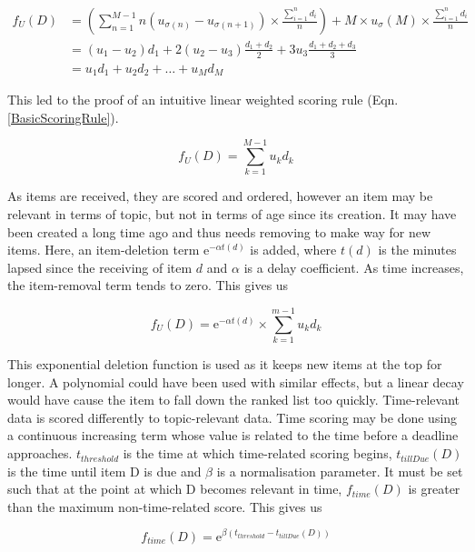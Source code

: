 \begin{align}\label{OurWeightedRuleDerivation}
f_U (D) &= \left(\sum_{n=1}^{M-1} n (u_{\sigma{(n)}} - u_{\sigma{(n+1)}})\times \frac{\sum_{i=1}^{n} d_i}{n}\right) + M \times u_\sigma{(M)} \times \frac{\sum_{i=1}^{n} d_i}{n} 
\\ &= (u_1-u_2)d_1 + 2(u_2-u_3)\frac{d_1+d_2}{2} + 3u_3\frac{d_1+d_2+d_3}{3}
\\ &= u_1d_1 + u_2d_2 + \dots + u_Md_M
\end{align}

This led to the proof of an intuitive linear weighted scoring rule (Eqn. \ref{BasicScoringRule}).

\begin{equation}\label{BasicScoringRule}
f_U (D) = \sum_{k=1}^{M-1} u_kd_k
\end{equation}

As items are received, they are scored and ordered, however an item may be relevant in terms of topic, but not in terms of age since its creation. It may have been created a long time ago and thus needs removing to make way for new items. Here, an item-deletion term ${\mathrm{e}}^{-\alpha t(d)}$ is added, where $t(d)$ is the minutes lapsed since the receiving of item $d$ and $\alpha$ is a delay coefficient. As time increases, the item-removal term tends to zero. This gives us

\begin{equation}\label{BasicScoringRule2}
	f_U (D) = {\mathrm{e}}^{-\alpha t(d)} \times \sum_{k=1}^{m-1} u_kd_k
\end{equation}

This exponential deletion function is used as it keeps new items at the top for longer. A polynomial could have been used with similar effects, but a linear decay would have cause the item to fall down the ranked list too quickly.
Time-relevant data is scored differently to topic-relevant data. Time scoring may be done using a continuous increasing term whose value is related to the time before a deadline approaches. $t_{threshold}$ is the time at which time-related scoring begins, $t_{tillDue}(D)$ is the time until item D is due and $\beta$ is a normalisation parameter. It must be set such that at the point at which D becomes relevant in time, $f_{time}(D)$ is greater than the maximum non-time-related score. This gives us

\begin{equation}\label{BasicTimeScoringRule}
	f_{time} (D) = {\mathrm{e}}^{\beta (t_{threshold}-t_{tillDue}(D))}
\end{equation}

